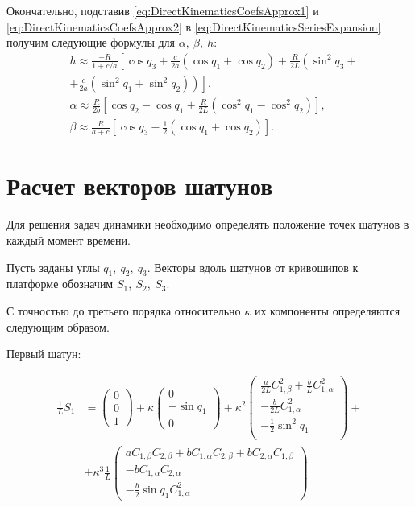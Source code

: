Окончательно, подставив \ref{eq:DirectKinematicsCoefsApprox1} и \ref{eq:DirectKinematicsCoefsApprox2} в \ref{eq:DirectKinematicsSeriesExpansion} получим следующие формулы для $\alpha,~\beta,~h$:
\begin{equation}
\label{eq:DireKinematicsAnalytic}
\begin{aligned}
	& h \approx \frac{-R}{1+c/a}\left[\cos{q_3} + \frac{c}{2a}\left(\cos{q_1} + \cos{q_2}\right) + \frac{R}{2L}\left(\sin^2{q_3} + \right.\right.\\
	& \left.\left. + \frac{c}{2a}\left(\sin^2{q_1} + \sin^2{q_2}\right)\right)\right], \\
	& \alpha \approx \frac{R}{2b}\left[\cos{q_2}-\cos{q_1} + \frac{R}{2L}\left(\cos^2{q_1}-\cos^2{q_2}\right)\right],\\
	& \beta \approx \frac{R}{a+c}\left[\cos{q_3} - \frac{1}{2}\left(\cos{q_1} + \cos{q_2}\right)\right].
\end{aligned}
\end{equation}

\section{Расчет векторов шатунов}
Для решения задач динамики необходимо определять положение точек шатунов в каждый момент времени.

Пусть заданы углы $q_1,~q_2,~q_3$. Векторы вдоль шатунов от кривошипов к платформе обозначим $S_1,~S_2,~S_3$.

С точностью до третьего порядка относительно $\kappa$ их компоненты определяются следующим образом.

Первый шатун:

\begin{equation}
\begin{aligned}
\frac{1}{L}S_1 &= \begin{pmatrix}0 \\ 0 \\ 1\end{pmatrix} + \kappa\begin{pmatrix}0 \\ -\sin{q_1}\\ 0\end{pmatrix} + \kappa^2\begin{pmatrix}\frac{a}{2L}C^2_{1,\beta} + \frac{b}{L}C_{1,\alpha}^2\\-\frac{b}{2L}C_{1,\alpha}^2\\ -\frac{1}{2}\sin^2{q_1} \\ \end{pmatrix} + \\
& + \kappa^3\frac{1}{L}\begin{pmatrix}aC_{1,\beta}C_{2,\beta} + bC_{1,\alpha}C_{2,\beta} + bC_{2,\alpha}C_{1,\beta} \\ -bC_{1,\alpha}C_{2,\alpha} \\ -\frac{b}{2}\sin{q_1}C_{1,\alpha}^2\end{pmatrix}
\end{aligned}
\end{equation}

